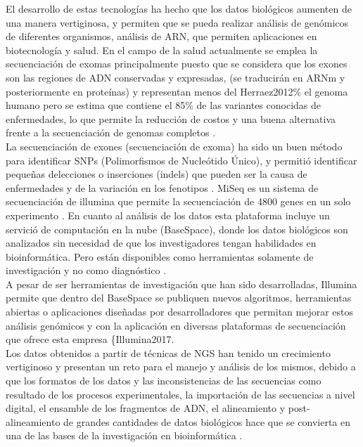 El desarrollo de estas tecnologías ha hecho que los datos biológicos aumenten de una manera vertiginosa, y permiten que se pueda realizar análisis de genómicos de diferentes organismos, análisis de ARN, que permiten aplicaciones en biotecnología y salud. En el campo de la salud actualmente se emplea la secuenciación de exomas principalmente puesto que se considera que los exones son las regiones de ADN conservadas y expresadas, (se traducirán en ARNm y posteriormente en proteínas) y representan menos del Herraez2012\% el genoma humano pero se estima que contiene el 85\% de las variantes conocidas de enfermedades, lo que permite la reducción de costos y una buena alternativa frente a la secuenciación de genomas completos \cite{Illumina2017,Klug2013}.\\ 

La secuenciación de exones (secuenciación de exoma) ha sido un buen método para identificar SNPs (Polimorfismos de Nucleótido Único), y permitió identificar pequeñas delecciones o inserciones (indels) que pueden  ser la causa de enfermedades y de la variación en los fenotipos \cite{Deng2011}. MiSeq es un sistema de secuenciación de illumina que permite la secuenciación de 4800 genes en un solo experimento \cite{Illumina2017}. En cuanto al análisis de los datos esta plataforma incluye un servició de computación en la nube (BaseSpace), donde los datos biológicos son analizados  sin necesidad de que los investigadores tengan habilidades en bioinformática. Pero están disponibles como herramientas solamente de investigación y no como diagnóstico {\cite{Illumina2017} . \\

A pesar de ser herramientas de investigación  que han sido desarrolladas, Illumina permite que dentro del BaseSpace se publiquen nuevos algoritmos, herramientas abiertas o aplicaciones diseñadas por desarrolladores que permitan mejorar estos análisis genómicos y con la aplicación en diversas plataformas de secuenciación que ofrece esta empresa \{Illumina2017}. \\

Los datos obtenidos a partir de técnicas de NGS han tenido un crecimiento vertiginoso y presentan un reto para el manejo y análisis de los mismos, debido a que los formatos de los datos y las inconsistencias de las secuencias como resultado de los procesos experimentales, la importación de las secuencias a nivel digital, el ensamble de los fragmentos de ADN, el alineamiento y post-alineamiento de grandes cantidades de datos biológicos hace que se convierta en una de las bases de la investigación en bioinformática \cite{Deng2011,Triplet2014}.\\

